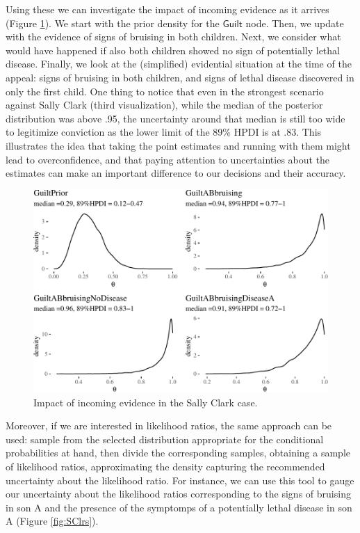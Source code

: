 \documentclass[
  10pt,
  dvipsnames,enabledeprecatedfontcommands]{scrartcl}
\newcommand{\s}[1]{\mbox{$\mathsf{#1}$}}
\begin{document}
Using these we can investigate the impact of incoming evidence as it
arrives (Figure \ref{fig:SCwithHOP2}). We start with the prior density
for the \s{Guilt} node. Then, we update with the evidence of signs of
bruising in both children. Next, we consider what would have happened if
also both children showed no sign of potentially lethal disease.
Finally, we look at the (simplified) evidential situation at the time of
the appeal: signs of bruising in both children, and signs of lethal
disease discovered in only the first child. One thing to notice that
even in the strongest scenario against Sally Clark (third
visualization), while the median of the posterior distribution was above
.95, the uncertainty around that median is still too wide to legitimize
conviction as the lower limit of the 89\% HPDI is at .83. This
illustrates the idea that taking the point estimates and running with
them might lead to overconfidence, and that paying attention to
uncertainties about the estimates can make an important difference to
our decisions and their accuracy.

\begin{figure}[H]

\begin{center}\includegraphics[width=0.9\linewidth]{chapter-outline_files/figure-latex/SCwithHOP2-1} \end{center}


\caption{Impact of incoming evidence in the Sally Clark case.}
\label{fig:SCwithHOP2}
\end{figure}

Moreover, if we are interested in likelihood ratios, the same approach
can be used: sample from the selected distribution appropriate for the
conditional probabilities at hand, then divide the corresponding
samples, obtaining a sample of likelihood ratios, approximating the
density capturing the recommended uncertainty about the likelihood
ratio. For instance, we can use this tool to gauge our uncertainty about
the likelihood ratios corresponding to the signs of bruising in son A
and the presence of the symptomps of a potentially lethal disease in son
A (Figure \ref{fig:SClrs}).
\end{document}
